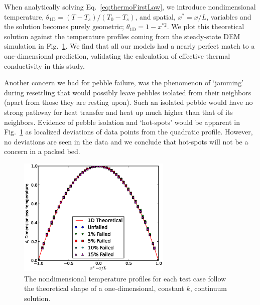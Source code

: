 When analytically solving Eq.~\ref{eq:thermoFirstLaw}, we introduce nondimensional temperature, $\theta_\text{1D} = (T -T_s)/(T_0-T_s)$, and spatial, $x^* = x/L$, variables and the solution becomes purely geometric; $\theta_\text{1D} = 1-x^{*2}$. We plot this theoretical solution against the temperature profiles coming from the steady-state DEM simulation in Fig.~\ref{fig:tempProfile}. We find that all our models had a nearly perfect match to a one-dimensional prediction, validating the calculation of effective thermal conductivity in this study. 

Another concern we had for pebble failure, was the phenomenon of `jamming' during resettling that would possibly leave pebbles isolated from their neighbors (apart from those they are resting upon). Such an isolated pebble would have no strong pathway for heat transfer and heat up much higher than that of its neighbors. Evidence of pebble isolation and `hot-spots' would be apparent in Fig.~\ref{fig:tempProfile} as localized deviations of data points from the quadratic profile. However, no deviations are seen in the data and we conclude that hot-spots will not be a concern in a packed bed.

\begin{figure}[htbp]
	\centering
	\includegraphics[width=0.65\textwidth]{chapters/figures/tempProfiles}
	\caption{The nondimensional temperature profiles for each test case follow the theoretical shape of a one-dimensional, constant $k$, continuum solution.}
\label{fig:tempProfile}
\end{figure}



